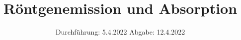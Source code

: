 

\subject{VERSUCH NUMMER 602}
\title{Röntgenemission und Absorption}
\date{%
  Durchführung: 5.4.2022
  \hspace{3em}
  Abgabe: 12.4.2022
}



\maketitle
\thispagestyle{empty}
\tableofcontents
\newpage






\printbibliography{}


